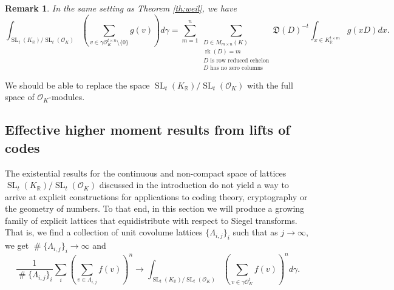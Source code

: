 \documentclass{amsart}
\newtheorem{remark}[theorem]{Remark}
\newcommand{\OK}{\mathcal{O}_K}
\DeclareMathOperator{\SL}{SL}
\DeclareMathOperator{\card}{\texttt{\#}}
\DeclareMathOperator{\rank}{rk}
\newcommand{\nihar}{\color{red}}
\begin{document}
\begin{remark}
\label{re:non-zero_terms}
In the same setting as Theorem \ref{th:weil}, we have 
\begin{equation}
\int_{\SL_{t}(K_\mathbb{R})/\SL_{t}(\OK)} \left(\sum_{v \in \gamma \mathcal{O}_K^{ t \times n}\setminus \{0\}} g(v)  \right) d \gamma
=
\sum_{m=1}^{{n}}\sum_{\substack{D \in M_{m \times n }(K) \\ 
\rank(D) = m \\ 
D \text{ is row reduced echelon} \\ D \text{ has no zero columns }}}
\mathfrak{D}(D)^{-t} \int_{x \in K_\mathbb{R}^{t \times m }} g(x D ) dx.
\end{equation}



\end{remark}
{
\nihar

We should be able to replace the space $\SL_t(K_\mathbb{R})/\SL_t(\OK)$ with the full space of $\OK$-modules.
}


\subsection{Effective higher moment results from lifts of codes}

The existential results for the continuous and non-compact space of lattices $\SL_t(K_\mathbb{R})/\SL_{t}(\mathcal{O}_K)$ discussed in the introduction do not yield a way to arrive at explicit constructions for applications to coding theory, cryptography or the geometry of numbers. To that end, in this section we will produce a growing family of explicit lattices that equidistribute with respect to Siegel transforms. That is, we find a collection of unit covolume lattices $\{\Lambda_{i,j}\}_{i}$ such that as $j \rightarrow \infty$, we get $\card \{\Lambda_{i,j}\}_{i} \to \infty$ and
\begin{equation}
  \frac{1}{\card \{\Lambda_{i,j}\}_{i}}  \sum_{i} \left( \sum_{v \in \Lambda_{i,j}}  f(v) \right)^{n}\rightarrow  \int_{\SL_{t}(K_\mathbb{R})/\SL_{t}(\mathcal{O}_{K})} \left(\sum_{v \in \gamma \mathcal{O}_{K}^{t }} f(v)\right)^{n} d \gamma.
\end{equation}
\fi
\end{document}
